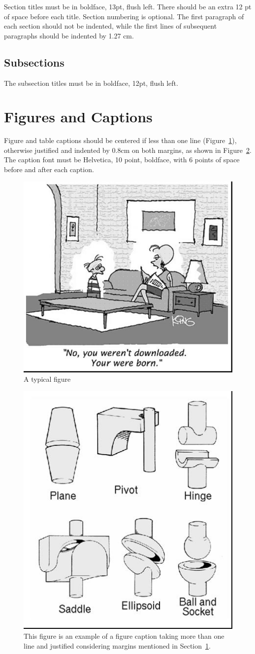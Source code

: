 \documentclass[12pt]{article}
\begin{document}
Section titles must be in boldface, 13pt, flush left. There should be an extra
12 pt of space before each title. Section numbering is optional. The first
paragraph of each section should not be indented, while the first lines of
subsequent paragraphs should be indented by 1.27 cm.

\subsection{Subsections}

The subsection titles must be in boldface, 12pt, flush left.

\section{Figures and Captions}\label{sec:figs}


Figure and table captions should be centered if less than one line
(Figure~\ref{fig:exampleFig1}), otherwise justified and indented by 0.8cm on
both margins, as shown in Figure~\ref{fig:exampleFig2}. The caption font must
be Helvetica, 10 point, boldface, with 6 points of space before and after each
caption.

\begin{figure}[ht]
\centering
\includegraphics[width=.5\textwidth]{fig1.jpg}
\caption{A typical figure}
\label{fig:exampleFig1}
\end{figure}

\begin{figure}[ht]
\centering
\includegraphics[width=.3\textwidth]{fig2.jpg}
\caption{This figure is an example of a figure caption taking more than one
  line and justified considering margins mentioned in Section~\ref{sec:figs}.}
\label{fig:exampleFig2}
\end{figure}
\end{document}
